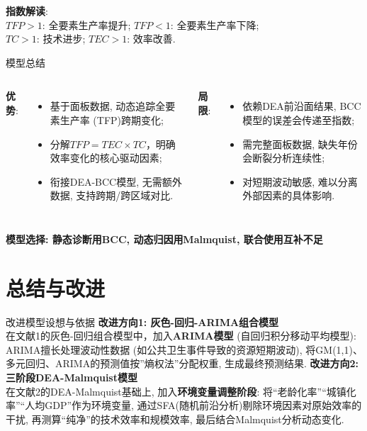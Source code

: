 \documentclass{beamer}
\begin{document}
\begin{frame}
\textbf{指数解读}: \\
      $TFP > 1$: 全要素生产率提升; $TFP < 1$: 全要素生产率下降; \\
      $TC > 1$: 技术进步; $TEC > 1$: 效率改善. 
\end{frame}

\begin{frame}{模型总结}
    \begin{columns}[T]
    \textbf{优势}: 
    \begin{itemize}
      \item 基于面板数据, 动态追踪全要素生产率 (TFP)跨期变化; 
      \item 分解$TFP=TEC \times TC$，明确效率变化的核心驱动因素; 
      \item 衔接DEA-BCC模型, 无需额外数据, 支持跨期/跨区域对比. 
    \end{itemize}
    \textbf{局限}: 
    \begin{itemize}
      \item 依赖DEA前沿面结果, BCC模型的误差会传递至指数;
      \item 需完整面板数据, 缺失年份会断裂分析连续性;
      \item 对短期波动敏感, 难以分离外部因素的具体影响.
    \end{itemize}
  \end{columns}
  \vspace{0.5cm}
  \centering
  \textbf{模型选择: 静态诊断用BCC, 动态归因用Malmquist, 联合使用互补不足}
\end{frame}

\section{总结与改进}

\begin{frame}{改进模型设想与依据}
\textbf{改进方向1: 灰色-回归-ARIMA组合模型}\\
\qquad 在文献1的灰色-回归组合模型中，加入\textbf{ARIMA模型} (自回归积分移动平均模型): ARIMA擅长处理波动性数据 (如公共卫生事件导致的资源短期波动), 将GM(1,1)、多元回归、ARIMA的预测值按''熵权法''分配权重, 生成最终预测结果. 
\textbf{改进方向2: 三阶段DEA-Malmquist模型}\\
\qquad 在文献2的DEA-Malmquist基础上, 加入\textbf{环境变量调整阶段}: 将“老龄化率”“城镇化率”“人均GDP”作为环境变量, 通过SFA(随机前沿分析)剔除环境因素对原始效率的干扰, 再测算“纯净”的技术效率和规模效率, 最后结合Malmquist分析动态变化. 

\end{frame}

\QApage
\end{document}
